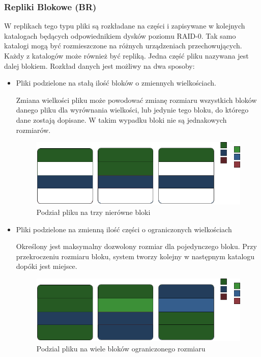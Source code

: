 \subsubsection{Repliki Blokowe (BR)}
W replikach tego typu pliki są rozkładane na części i zapisywane w kolejnych katalogach będących odpowiednikiem dysków poziomu RAID-0. Tak samo katalogi mogą być rozmieszczone na różnych urządzeniach przechowujących. Każdy z katalogów może również być repliką. Jedna część pliku nazywana jest dalej blokiem.
Rozkład danych jest możliwy na dwa sposoby:
\begin{itemize}
    \item Pliki podzielone na stałą ilość bloków o zmiennych wielkościach. 

            Zmiana wielkości pliku może powodować zmianę rozmiaru wszystkich bloków danego pliku dla wyrównania wielkości, lub jedynie tego bloku, do którego dane zostają dopisane. W takim wypadku bloki nie są jednakowych rozmiarów.
            \begin{figure}[h!]
                    \centering
                    \includegraphics{BR-1.png}
                    \caption{Podział pliku na trzy nierówne bloki }
                    \label{fig:br1}
            \end{figure}
    \item Pliki podzielone na zmienną ilość części o ograniczonych wielkościach

            Określony jest maksymalny dozwolony rozmiar dla pojedynczego bloku. Przy przekroczeniu rozmiaru bloku, system tworzy kolejny w następnym katalogu dopóki jest miejsce. 
            \begin{figure}[h!]
                    \centering
                    \includegraphics{BR-2.png}
                    \caption{Podzial pliku na wiele bloków ograniczonego rozmiaru}
                    \label{fig:br1}
            \end{figure}
 
\end{itemize}
